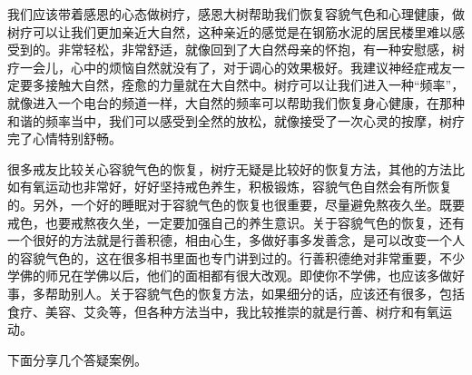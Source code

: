 我们应该带着感恩的心态做树疗，感恩大树帮助我们恢复容貌气色和心理健康，做树疗可以让我们更加亲近大自然，这种亲近的感觉是在钢筋水泥的居民楼里难以感受到的。非常轻松，非常舒适，就像回到了大自然母亲的怀抱，有一种安慰感，树疗一会儿，心中的烦恼自然就没有了，对于调心的效果极好。我建议神经症戒友一定要多接触大自然，痊愈的力量就在大自然中。树疗可以让我们进入一种“频率”，就像进入一个电台的频道一样，大自然的频率可以帮助我们恢复身心健康，在那种和谐的频率当中，我们可以感受到全然的放松，就像接受了一次心灵的按摩，树疗完了心情特别舒畅。

很多戒友比较关心容貌气色的恢复，树疗无疑是比较好的恢复方法，其他的方法比如有氧运动也非常好，好好坚持戒色养生，积极锻炼，容貌气色自然会有所恢复的。另外，一个好的睡眠对于容貌气色的恢复也很重要，尽量避免熬夜久坐。既要戒色，也要戒熬夜久坐，一定要加强自己的养生意识。关于容貌气色的恢复，还有一个很好的方法就是行善积德，相由心生，多做好事多发善念，是可以改变一个人的容貌气色的，这在很多相书里面也专门讲到过的。行善积德绝对非常重要，不少学佛的师兄在学佛以后，他们的面相都有很大改观。即使你不学佛，也应该多做好事，多帮助别人。关于容貌气色的恢复方法，如果细分的话，应该还有很多，包括食疗、美容、艾灸等，但各种方法当中，我比较推崇的就是行善、树疗和有氧运动。

下面分享几个答疑案例。

